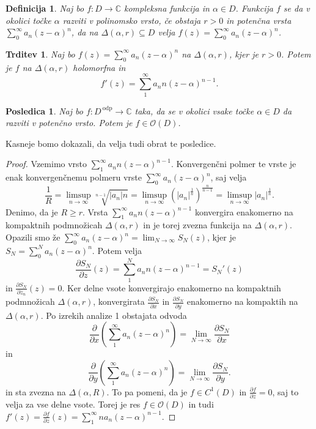 \documentclass[10pt, a4paper]{article}
\newtheorem{posledica}[izr]{Posledica}
\newtheorem{trditev}[izr]{Trditev}
\newtheorem{defi}{Definicija}[section]
\newenvironment{noticeB}{%
  \tcolorbox[%
  notitle,
  empty,
  enhanced,  %
  breakable,
  coltext=black,
  colback=white, 
  fontupper=\rmfamily,
  parbox=false,
  noparskip,
  sharp corners,
  boxrule=-1pt,  %
  frame hidden,
  left=7pt,  %
  right=7pt,
  top=5pt,
  bottom=5pt,
  before skip=2.5ex plus 2pt,
  after skip=2.5ex plus 2pt,
  borderline west = {1.5pt}{-0.1pt}{blue!30!black}, %
  overlay unbroken and last={%
    \draw[color=black, line width=1.25pt]
    ($(frame.south west)+(1.pt, -0.1pt)$) -- ++(2em, 0);
  }
  ]}
{\endtcolorbox}
\newenvironment{definicija}{\begin{defi}\begin{noticeB}}{%
    \end{noticeB}\end{defi}}
\newenvironment{noticeC}{%
  \tcolorbox[%
  notitle,
  empty,
  enhanced,  %
  breakable,
  coltext=black, 
  fontupper=\rmfamily,
  parbox=false,
  noparskip,
  sharp corners,
  boxrule=-1pt,  %
  frame hidden,
  left=7pt,  %
  right=7pt,
  top=5pt,
  bottom=5pt,
  before skip=2.5ex plus 2pt,
  after skip=2.5ex plus 2pt,
  overlay unbroken and last={%
  },
  ]}
{\endtcolorbox}
\newenvironment{dokaz}%
  {\begin{noticeC}\begin{proof}}%
  {\end{proof}\end{noticeC}}
\newcommand{\C}{\mathbb {C}}
\begin{document}
\begin{definicija}
  Naj bo $f: D \to \C$ kompleksna funkcija in $\alpha \in D$.
  Funkcija $f$ se da v okolici točke $\alpha$ razviti v polinomsko vrsto,
  če obstaja $r > 0$ in potenčna vrsta $\sum_{0} ^\infty a_n (z - \alpha)^n$,
  da na $\Delta (\alpha, r) \subseteq D$ velja $f(z) = \sum_0 ^\infty a_n (z - \alpha)^n$.
\end{definicija}

\begin{trditev}
  Naj bo $f(z) = \sum_0 ^\infty a_n (z - \alpha)^n$ na $\Delta (\alpha, r)$, kjer je $r > 0$.
  Potem je $f$ na $\Delta (\alpha, r)$ holomorfna in $$f'(z) = \sum_{1} ^\infty a_n n (z - \alpha)^{n - 1}.$$
\end{trditev}

\begin{posledica}
  Naj bo $f: D^{\ \text{odp}} \to \C$ taka, da se v okolici vsake točke $\alpha \in D$
  da razviti v potenčno vrsto. Potem je $f \in \mathcal{O} (D)$.
\end{posledica}

Kasneje bomo dokazali, da velja tudi obrat te posledice.

\begin{dokaz}
  Vzemimo vrsto $\sum_1 ^\infty a_n n (z - \alpha)^{n - 1}$.
  Konvergenčni polmer te vrste je enak konvergenčnemu polmeru vrste $\sum_0 ^\infty a_n (z - \alpha)^n$,
  saj velja 
  $$\frac{1}{R} = \limsup_{n \to \infty} \sqrt[n - 1]{|a_n| n} = \limsup_{n \to \infty} \left(|a_n|^{\frac{1}{n}}\right)^{\frac{n}{n - 1}} = \limsup_{n \to \infty} |a_n|^{\frac{1}{n}}.$$
  Denimo, da je $R \geq r$. Vrsta $\sum_1 ^\infty a_n n (z - \alpha)^{n - 1}$ konvergira enakomerno na 
  kompaktnih podmnožicah $\Delta (\alpha, r)$ in je torej zvezna funkcija na $\Delta (\alpha, r)$.
  Opazili smo že $\sum_{0} ^\infty a_n (z - \alpha)^{n} = \lim_{N \to \infty} S_N (z)$,
  kjer je $S_N = \sum_0 ^N a_n (z - \alpha)^n$.
  Potem velja $$\frac{\partial S_N}{\partial z} (z) = \sum_1 ^N a_n n (z - \alpha)^{n - 1} = S_N ' (z)$$
  in $\frac{\partial S_N}{\partial \overline{z}_n} (z) = 0$.
  Ker delne vsote konvergirajo enakomerno na kompaktnih podmnožicah $\Delta (\alpha, r)$,
  konvergirata $\frac{\partial S_N}{\partial x}$ in $\frac{\partial S_N}{\partial y}$ enakomerno na kompaktih 
  na $\Delta (\alpha, r)$.
  Po izrekih analize 1 obstajata odvoda $$\frac{\partial}{\partial x} \left(\sum_1 ^\infty a_n (z - \alpha)^n\right) = \lim_{N \to \infty} \frac{\partial S_N}{\partial x}$$
  in $$\frac{\partial}{\partial y} \left(\sum_1 ^\infty a_n (z - \alpha)^n\right) = \lim_{N \to \infty} \frac{\partial S_N}{\partial y}.$$
  in sta zvezna na $\Delta (\alpha, R)$. To pa pomeni, da je $f \in C^1 (D)$
  in $\frac{\partial f}{\partial \overline{z}} = 0$, saj to velja za vse delne vsote.
  Torej je res $f \in \mathcal{O} (D)$ in tudi $f'(z) = \frac{\partial f}{\partial z} (z) = \sum_1 ^\infty n a_n (z - \alpha)^{n - 1}.$
\end{dokaz}
\end{document}
